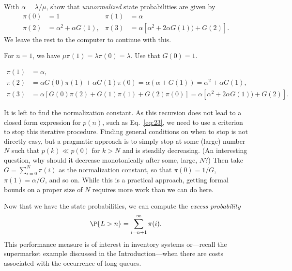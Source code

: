 \begin{exercise}\label{ex:13}
With $\alpha = \lambda/\mu$,  show that \emph{unnormalized} state probabilities are given by
\begin{align*}
\pi(0) & = 1 &
  \pi(1) &= \alpha \\
  \pi(2) &= \alpha^2 + \alpha G(1), &
  \pi(3) &= \alpha[ \alpha^2 + 2 \alpha G(1)) + G(2)].
\end{align*}
We leave the rest to the computer to continue with this.
\begin{hint}
For $n=1$, we have
$\mu \pi(1) = \lambda \pi(0)=\lambda$. Use that $G(0)=1$.
\end{hint}
\begin{solution}
\begin{equation*}
  \begin{split}
  \pi(1) &= \alpha, \\
  \pi(2) &= \alpha G(0) \pi(1) + \alpha G(1) \pi(0) =\alpha(\alpha+ G(1)) = \alpha^2 + \alpha G(1), \\
  \pi(3) 
&= \alpha[G(0) \pi(2) + G(1) \pi(1) + G(2) \pi(0)]  = \alpha[ \alpha^2 + 2 \alpha G(1)) + G(2)].
  \end{split}
\end{equation*}
\end{solution}  
\end{exercise}

It is left to find the normalization constant.  As this recursion does
not lead to a closed form expression for $p(n)$, such as
Eq.~\eqref{eq:23}, we need to use a criterion to stop this iterative
procedure. Finding general conditions on when to stop is not directly
easy, but a pragmatic approach is to simply stop at some (large)
number $N$ such that $p(k)\ll p(0)$ for $k>N$ and is steadily decreasing. (An interesting question, why should it decrease monotonically after some, large, $N$?)
Then take $G=\sum_{i=0}^N \pi(i)$ as the normalization
constant, so that $\pi(0)=1/G$, $\pi(1)=\alpha/G$, and so on.
While this is a practical approach, getting formal bounds on a proper size of $N$ requires more work than we can do here.

Now that we have the state probabilities, we can compute the \emph{excess probability}
\begin{equation}
  \P{L> n } = \sum_{i=n+1}^\infty \pi(i).
\end{equation}
This performance measure is  of interest in inventory systems or---recall the supermarket example discussed in the Introduction---when there are costs associated with the occurrence of long queues. 

